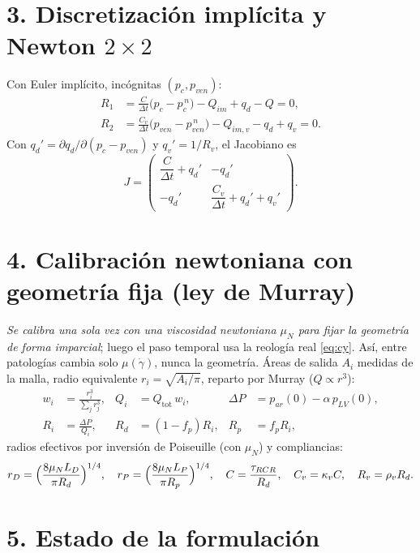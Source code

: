 \documentclass[11pt]{article}
\begin{document}
\section*{3. Discretización implícita y Newton $2\times2$}

Con Euler implícito, incógnitas $(p_c,p_{ven})$:
\begin{align}
  R_1 &= \frac{C}{\Delta t}\bigl(p_c-p_c^{\,n}\bigr)-Q_{im}+q_d-Q=0,
  \label{eq:R1}\\
  R_2 &= \frac{C_v}{\Delta t}\bigl(p_{ven}-p_{ven}^{\,n}\bigr)-Q_{im,v}-q_d+q_v=0.
  \label{eq:R2}
\end{align}
Con $q_d'=\partial q_d/\partial(p_c-p_{ven})$ y $q_v'=1/R_v$, el Jacobiano es
\begin{equation}
  J=\begin{pmatrix}
    \dfrac{C}{\Delta t}+q_d' & -q_d' \\[6pt]
    -q_d' & \dfrac{C_v}{\Delta t}+q_d'+q_v'
  \end{pmatrix}.
  \label{eq:jac}
\end{equation}

\section*{4. Calibración newtoniana con geometría fija (ley de Murray)}

\emph{Se calibra una sola vez con una viscosidad newtoniana $\mu_N$ para fijar
la geometría de forma imparcial}; luego el paso temporal usa la reología real
\eqref{eq:cy}. Así, entre patologías cambia solo $\mu(\dot\gamma)$, nunca la
geometría. Áreas de salida $A_i$ medidas de la malla, radio equivalente
$r_i=\sqrt{A_i/\pi}$, reparto por Murray ($Q\propto r^3$):
\begin{align}
  w_i &= \frac{r_i^{3}}{\sum_j r_j^{3}}, &
  Q_i &= Q_{\text{tot}}\,w_i, &
  \Delta P &= p_{ar}(0)-\alpha\,p_{LV}(0),\\
  R_i &= \frac{\Delta P}{Q_i}, &
  R_d &= (1-f_p)R_i, & R_p &= f_p R_i,
  \label{eq:murray}
\end{align}
radios efectivos por inversión de Poiseuille (con $\mu_N$) y compliancias:
\begin{equation}
  r_D=\Bigl(\frac{8\mu_N L_D}{\pi R_d}\Bigr)^{1/4},\quad
  r_P=\Bigl(\frac{8\mu_N L_P}{\pi R_p}\Bigr)^{1/4},\quad
  C=\frac{\tau_{RCR}}{R_d},\quad
  C_v=\kappa_v C,\quad R_v=\rho_v R_d .
  \label{eq:geom}
\end{equation}

\section*{5. Estado de la formulación}
\end{document}
